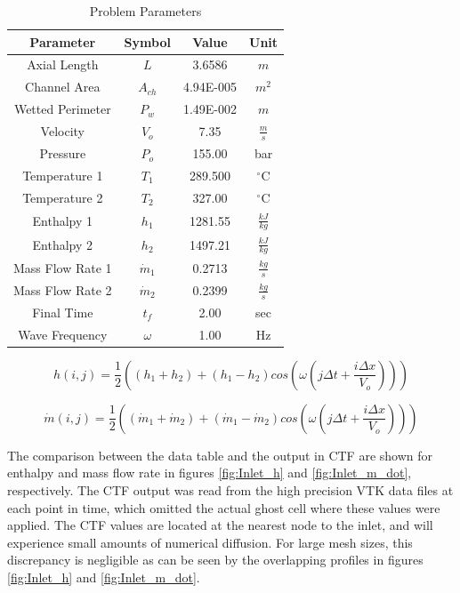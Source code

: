 \begin{table}[h]
\center
\caption{Problem Parameters}
\label{table:parameters}
\begin{tabular}{|c|c|c|c|}
\hline
Parameter	&	Symbol	&	Value	&	Unit	\\ \hline
Axial Length	&	$L$	&	3.6586	&	$m$	\\ \hline
Channel Area	&	$A_{ch}$	&	4.94E-005	&	$m^{2}$	\\ \hline
Wetted Perimeter	&	$P_{w}$	&	1.49E-002	&	$m$	\\ \hline
Velocity	&	$V_{o}$	&	7.35	&	$\frac{m}{s}$	\\ \hline
Pressure	&	$P_{o}$	&	155.00	&	bar	\\ \hline
Temperature 1	&	$T_{1}$	&	289.500	&	$^{\circ}$C	\\ \hline
Temperature 2	&	$T_{2}$	&	327.00	&	$^{\circ}$C	\\ \hline
Enthalpy 1	&	$h_{1}$	&	1281.55	&	$\frac{kJ}{kg}$	\\ \hline
Enthalpy 2	&	$h_{2}$	&	1497.21	&	$\frac{kJ}{kg}$	\\ \hline
Mass Flow Rate 1	&	$\dot{m}_{1}$	&	0.2713	&	$\frac{kg}{s}$	\\ \hline
Mass Flow Rate 2	&	$\dot{m}_{2}$	&	0.2399	&	$\frac{kg}{s}$	\\ \hline
Final Time	&	$t_{f}$	&	2.00	&	sec	\\ \hline
Wave Frequency	&	$\omega$	&	1.00	&	Hz	\\ \hline
\end{tabular}
\end{table}

\begin{equation}
	\label{eq:Sine_Wave:h}
	h(i,j) = \frac{1}{2} \left( 
			(h_{1}+h_{2}) + (h_{1}-h_{2}) cos\left(
				\omega \left( j \Delta t + \frac{i \Delta x}{V_{o}} \right)
				\right)
			\right)
\end{equation}

\begin{equation}
	\label{eq:Sine_Wave:m_dot}
	\dot{m}(i,j) = \frac{1}{2} \left( 
			(\dot{m}_{1}+\dot{m}_{2}) + (\dot{m}_{1}-\dot{m}_{2}) cos\left(
				\omega \left( j \Delta t + \frac{i \Delta x}{V_{o}} \right)
				\right)
			\right)
\end{equation}

The comparison between the data table and the output in CTF are shown for
enthalpy and mass flow rate in figures \ref{fig:Inlet_h} and
\ref{fig:Inlet_m_dot}, respectively. The CTF output was read from the high
precision VTK data files \cite{Schroeder1998} at each point in time, which
omitted the actual ghost cell where these values were applied. The CTF values are located at the nearest
node to the inlet, and will experience small amounts of numerical diffusion. For
large mesh sizes, this discrepancy is negligible as can be seen by the
overlapping profiles in figures \ref{fig:Inlet_h} and \ref{fig:Inlet_m_dot}.


